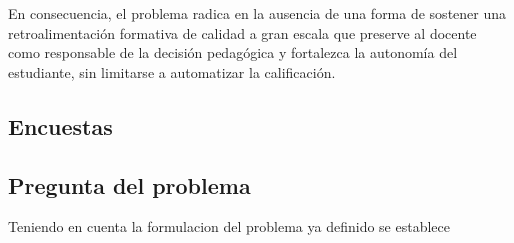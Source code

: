 \documentclass[letterpaper, 10 pt, conference]{ieeeconf}  %
\begin{document}
    En consecuencia, el problema radica en la ausencia de una forma de sostener una retroalimentación formativa de calidad a gran escala que preserve al docente como responsable de la decisión pedagógica y fortalezca la autonomía del estudiante, sin limitarse a automatizar la calificación.


    \subsection{Encuestas}
    


    
    \subsection{Pregunta del problema}
    Teniendo en cuenta la formulacion del problema ya definido se establece 

    


\addtolength{\textheight}{-12cm}   %







\end{document}
